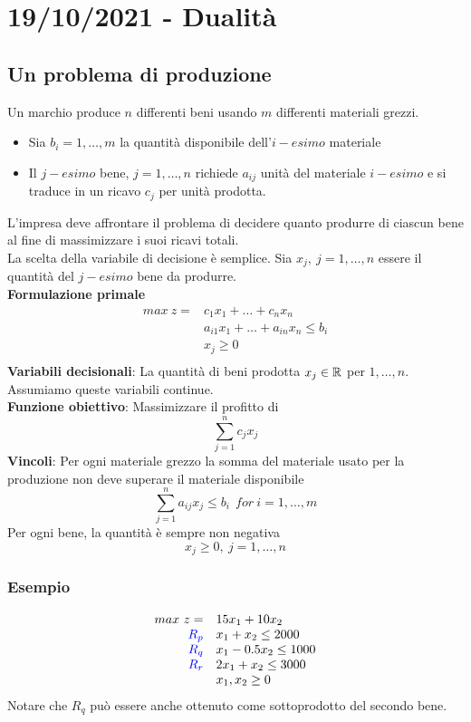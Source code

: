 \documentclass[12pt,a4paper]{article}
\begin{document}
\clearpage
\section{19/10/2021 - Dualità}
\subsection{Un problema di produzione}
Un marchio produce $n$ differenti beni usando $m$ differenti materiali grezzi.\\
\begin{itemize}
\item Sia $b_i=1, \dots, m$ la quantità disponibile dell'$i-esimo$ materiale
\item Il $j-esimo$ bene, $j = 1 ,\dots , n$ richiede $a_{ij}$ unità del materiale $i-esimo$ e si traduce in un ricavo $c_j$ per unità prodotta.
\end{itemize}
L'impresa deve affrontare il problema di decidere quanto produrre di ciascun bene al fine di massimizzare i suoi ricavi totali.\\
La scelta della variabile di decisione è semplice. Sia $x_j,\ j = 1 ,\dots , n$ essere il quantità del $j-esimo$ bene da produrre.\\
\textbf{Formulazione primale}
$$\begin{array}{rl}max \ z = & c_1x_1+\dots+c_nx_n\\
& a_{i1}x_1+\dots +a_{in}x_n \leq b_i\\
& x_j \geq 0\\
\end{array}$$
\textbf{Variabili decisionali}: La quantità di beni prodotta $x_j \in \mathbb{R}$ per $1,\dots,n$. Assumiamo queste variabili continue.\\
\textbf{Funzione obiettivo}: Massimizzare il profitto di $$\sum_{j=1}^nc_jx_j$$
\textbf{Vincoli}: Per ogni materiale grezzo la somma del materiale usato per la produzione non deve superare il materiale disponibile
$$\sum_{j=1}^na_{ij}x_j\leq b_i \ \ for \ i=1,\dots,m$$
Per ogni bene, la quantità è sempre non negativa $$x_j\geq 0, \ j = 1, \dots, n$$

\subsubsection{Esempio}
$$\begin{array}{rl}max \ z = & 15x_1+10x_2\\
\textcolor{blue}{R_p} & x_1+x_2 \leq 2000\\
\textcolor{blue}{R_q} & x_1-0.5x_2 \leq 1000\\
\textcolor{blue}{R_r} & 2x_1+x_2 \leq 3000\\
& x_1, x_2 \geq 0\\
\end{array}$$
Notare che $R_q$ può essere anche ottenuto come sottoprodotto del secondo bene.
\end{document}
